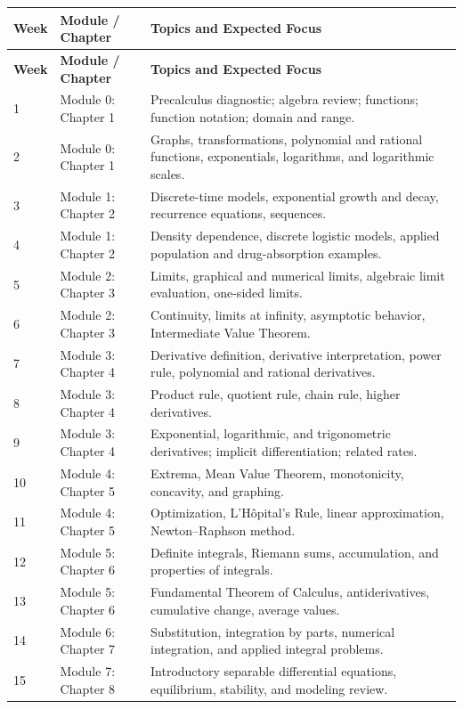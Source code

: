 \documentclass[11pt]{article}
\begin{document}
\begin{longtable}{p{} p{} p{}}
\toprule
\textbf{Week} & \textbf{Module / Chapter} & \textbf{Topics and Expected Focus} \\
\midrule
\endfirsthead

\toprule
\textbf{Week} & \textbf{Module / Chapter} & \textbf{Topics and Expected Focus} \\
\midrule
\endhead

1 & Module 0: Chapter 1 & Precalculus diagnostic; algebra review; functions; function notation; domain and range. \\
2 & Module 0: Chapter 1 & Graphs, transformations, polynomial and rational functions, exponentials, logarithms, and logarithmic scales. \\
3 & Module 1: Chapter 2 & Discrete-time models, exponential growth and decay, recurrence equations, sequences. \\
4 & Module 1: Chapter 2 & Density dependence, discrete logistic models, applied population and drug-absorption examples. \\
5 & Module 2: Chapter 3 & Limits, graphical and numerical limits, algebraic limit evaluation, one-sided limits. \\
6 & Module 2: Chapter 3 & Continuity, limits at infinity, asymptotic behavior, Intermediate Value Theorem. \\
7 & Module 3: Chapter 4 & Derivative definition, derivative interpretation, power rule, polynomial and rational derivatives. \\
8 & Module 3: Chapter 4 & Product rule, quotient rule, chain rule, higher derivatives. \\
9 & Module 3: Chapter 4 & Exponential, logarithmic, and trigonometric derivatives; implicit differentiation; related rates. \\
10 & Module 4: Chapter 5 & Extrema, Mean Value Theorem, monotonicity, concavity, and graphing. \\
11 & Module 4: Chapter 5 & Optimization, L'H\^{o}pital's Rule, linear approximation, Newton--Raphson method. \\
12 & Module 5: Chapter 6 & Definite integrals, Riemann sums, accumulation, and properties of integrals. \\
13 & Module 5: Chapter 6 & Fundamental Theorem of Calculus, antiderivatives, cumulative change, average values. \\
14 & Module 6: Chapter 7 & Substitution, integration by parts, numerical integration, and applied integral problems. \\
15 & Module 7: Chapter 8 & Introductory separable differential equations, equilibrium, stability, and modeling review. \\
\bottomrule
\end{longtable}
\end{document}
